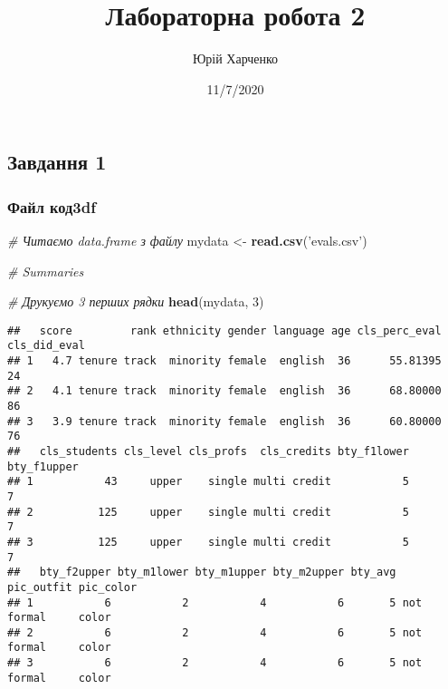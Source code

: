 \documentclass[
]{article}
\title{Лабораторна робота 2}
\author{Юрій Харченко}
\date{11/7/2020}
\newenvironment{Shaded}{\begin{snugshade}}{\end{snugshade}}
\newcommand{\CommentTok}[1]{\textcolor[rgb]{0.56,0.35,0.01}{\textit{#1}}}
\newcommand{\DecValTok}[1]{\textcolor[rgb]{0.00,0.00,0.81}{#1}}
\newcommand{\KeywordTok}[1]{\textcolor[rgb]{0.13,0.29,0.53}{\textbf{#1}}}
\newcommand{\NormalTok}[1]{#1}
\newcommand{\StringTok}[1]{\textcolor[rgb]{0.31,0.60,0.02}{#1}}
\begin{document}
\maketitle

\hypertarget{ux437ux430ux432ux434ux430ux43dux43dux44f-1}{%
\subsection{Завдання
1}\label{ux437ux430ux432ux434ux430ux43dux43dux44f-1}}

\hypertarget{ux444ux430ux439ux43b-ux43aux43eux4343df}{%
\subsubsection{Файл
код3df}\label{ux444ux430ux439ux43b-ux43aux43eux4343df}}

\begin{Shaded}
\begin{Highlighting}[]
\CommentTok{# Читаємо data.frame з файлу}
\NormalTok{mydata <-}\StringTok{ }\KeywordTok{read.csv}\NormalTok{(}\StringTok{'evals.csv'}\NormalTok{)}
\end{Highlighting}
\end{Shaded}

\begin{Shaded}
\begin{Highlighting}[]
\CommentTok{# Summaries}

\CommentTok{# Друкуємо 3 перших рядки }
\KeywordTok{head}\NormalTok{(mydata, }\DecValTok{3}\NormalTok{)}
\end{Highlighting}
\end{Shaded}

\begin{verbatim}
##   score         rank ethnicity gender language age cls_perc_eval cls_did_eval
## 1   4.7 tenure track  minority female  english  36      55.81395           24
## 2   4.1 tenure track  minority female  english  36      68.80000           86
## 3   3.9 tenure track  minority female  english  36      60.80000           76
##   cls_students cls_level cls_profs  cls_credits bty_f1lower bty_f1upper
## 1           43     upper    single multi credit           5           7
## 2          125     upper    single multi credit           5           7
## 3          125     upper    single multi credit           5           7
##   bty_f2upper bty_m1lower bty_m1upper bty_m2upper bty_avg pic_outfit pic_color
## 1           6           2           4           6       5 not formal     color
## 2           6           2           4           6       5 not formal     color
## 3           6           2           4           6       5 not formal     color
\end{verbatim}
\end{document}
